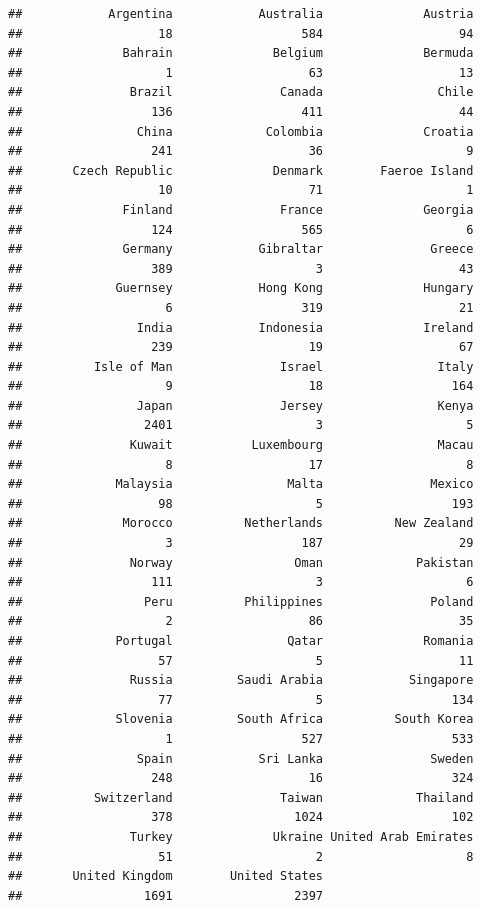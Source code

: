 \documentclass[
  12pt,
]{article}
\begin{document}
\begin{verbatim}
##            Argentina            Australia              Austria 
##                   18                  584                   94 
##              Bahrain              Belgium              Bermuda 
##                    1                   63                   13 
##               Brazil               Canada                Chile 
##                  136                  411                   44 
##                China             Colombia              Croatia 
##                  241                   36                    9 
##       Czech Republic              Denmark        Faeroe Island 
##                   10                   71                    1 
##              Finland               France              Georgia 
##                  124                  565                    6 
##              Germany            Gibraltar               Greece 
##                  389                    3                   43 
##             Guernsey            Hong Kong              Hungary 
##                    6                  319                   21 
##                India            Indonesia              Ireland 
##                  239                   19                   67 
##          Isle of Man               Israel                Italy 
##                    9                   18                  164 
##                Japan               Jersey                Kenya 
##                 2401                    3                    5 
##               Kuwait           Luxembourg                Macau 
##                    8                   17                    8 
##             Malaysia                Malta               Mexico 
##                   98                    5                  193 
##              Morocco          Netherlands          New Zealand 
##                    3                  187                   29 
##               Norway                 Oman             Pakistan 
##                  111                    3                    6 
##                 Peru          Philippines               Poland 
##                    2                   86                   35 
##             Portugal                Qatar              Romania 
##                   57                    5                   11 
##               Russia         Saudi Arabia            Singapore 
##                   77                    5                  134 
##             Slovenia         South Africa          South Korea 
##                    1                  527                  533 
##                Spain            Sri Lanka               Sweden 
##                  248                   16                  324 
##          Switzerland               Taiwan             Thailand 
##                  378                 1024                  102 
##               Turkey              Ukraine United Arab Emirates 
##                   51                    2                    8 
##       United Kingdom        United States 
##                 1691                 2397
\end{verbatim}
\end{document}
